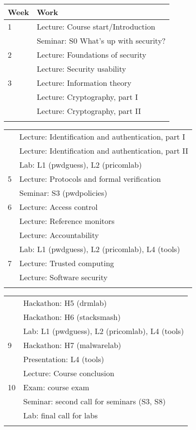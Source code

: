 	\centering
  \begin{tabular}{lp{9cm}}
    \toprule
    \textbf{Week}	& \textbf{Work} \\
    \midrule
    1
    & Lecture: Course start/Introduction\\
    & Seminar: S0 What's up with security?\\
    \midrule
    2
    & Lecture: Foundations of security\\
    & Lecture: Security usability\\
    \midrule
    3
    & Lecture: Information theory\\
    & Lecture: Cryptography, part I\\
    & Lecture: Cryptography, part II\\
    \midrule
\mode<presentation>{%
  \end{tabular}
  \begin{tabular}{lp{9cm}}
}%
    4
    & Lecture: Identification and authentication, part I\\
    & Lecture: Identification and authentication, part II\\
    & Lab: L1 (pwdguess), L2 (pricomlab)\\
    \midrule
    5
    & Lecture: Protocols and formal verification\\
    & Seminar: S3 (pwdpolicies)\\
    \midrule
    6
    & Lecture: Access control\\
    & Lecture: Reference monitors\\
    & Lecture: Accountability\\
    & Lab: L1 (pwdguess), L2 (pricomlab), L4 (tools)\\
    \midrule
    7
    & Lecture: Trusted computing\\
    & Lecture: Software security\\
    \midrule
\mode<presentation>{%
  \end{tabular}
  \begin{tabular}{lp{9cm}}
}%
    8
    & Hackathon: H5 (drmlab)\\
    & Hackathon: H6 (stacksmash)\\
    & Lab: L1 (pwdguess), L2 (pricomlab), L4 (tools)\\
    \midrule
    9
    & Hackathon: H7 (malwarelab)\\
    & Presentation: L4 (tools)\\
    & Lecture: Course conclusion\\
    \midrule
    10
    & Exam: course exam\\
    & Seminar: second call for seminars (S3, S8)\\
    & Lab: final call for labs\\
    \midrule
\mode<presentation>{%
  \end{tabular}

